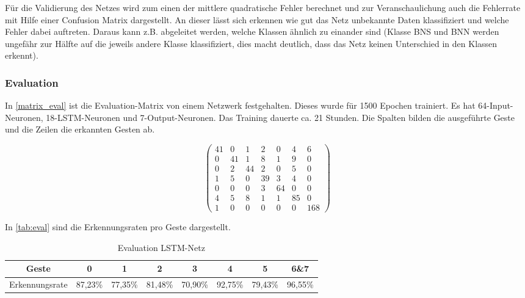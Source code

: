 Für die Validierung des Netzes wird zum einen der mittlere quadratische Fehler
berechnet und zur Veranschaulichung auch die Fehlerrate mit Hilfe einer
Confusion Matrix dargestellt. An dieser lässt sich erkennen wie gut das Netz
unbekannte Daten klassifiziert und welche Fehler dabei auftreten. Daraus kann
z.B.
abgeleitet werden, welche Klassen ähnlich zu einander sind (Klasse \ac{BNS} und
\ac{BNN} werden ungefähr zur Hälfte auf die jeweils andere Klasse klassifiziert,
dies macht deutlich, dass das Netz keinen Unterschied in den Klassen erkennt).


\subsubsection{Evaluation}
In \autoref{matrix_eval} ist die Evaluation-Matrix von einem Netzwerk festgehalten. 
Dieses wurde für 1500 Epochen trainiert. Es hat 64-Input-Neuronen, 18-LSTM-Neuronen 
und 7-Output-Neuronen. Das Training dauerte ca. 21 Stunden. Die Spalten bilden die 
ausgeführte Geste und die Zeilen die erkannten Gesten ab.

\begin{center}
\begin{equation}
\label{matrix_eval}
\begin{pmatrix}
41 & 0 & 1 & 2 & 0 & 4 & 6\\
0 & 41 & 1 & 8 & 1 & 9 & 0\\
0 & 2 & 44 & 2 & 0 & 5 & 0 \\
1 & 5 & 0 & 39 & 3 & 4 & 0 \\
0 & 0 & 0 & 3 & 64 & 0 & 0 \\
4 & 5 & 8 & 1 & 1 & 85 & 0 \\
1 & 0 & 0 & 0 & 0 & 0 & 168
\end{pmatrix}
\end{equation}
\end{center}

In \autoref{tab:eval} sind die Erkennungsraten pro Geste dargestellt.

\begin{table*}
\begin{tabular}{|c|c|c|c|c|c|c|c|}
\hline
 Geste 		& 0 & 1 & 2 & 3 & 4 & 5 & 6\&7 \\
 \hline
 Erkennungsrate  &87,23\%&77,35\%&81,48\%&70,90\%&92,75\%&79,43\%&96,55\%		\\
 \hline
\end{tabular}
\caption{Evaluation LSTM-Netz}
\label{tab:eval}
\end{table*}

